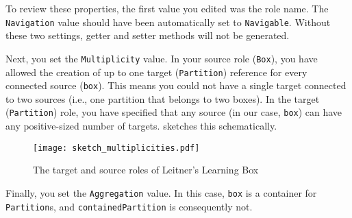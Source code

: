 To review these properties, the first value you edited was the role name. The \texttt{Navigation} value should have been automatically set to
\texttt{Na\-vi\-ga\-ble}. Without these two settings, getter and setter methods will not be generated.

Next, you set the \texttt{Multiplicity} value.  In your source role (\texttt{Box}), you have allowed the creation of up to one target (\texttt{Partition})
reference for every connected source (\texttt{box}). This means you could not have a single target connected to two sources (i.e., one partition that belongs to
two boxes). In the target (\texttt{Partition}) role, you have specified that any source (in our case, \texttt{box}) can have any positive-sized number of targets.
 sketches this schematically.

\vspace{0.5cm}

\begin{figure}[htbp]
	\centering
    \texttt{[image: sketch\_multiplicities.pdf]}
	\caption{The target and source roles of Leitner's Learning Box}
	\label{fig:sketch_roles}
\end{figure}
\FloatBarrier

Finally, you set the \texttt{Aggregation} value. In this case, \texttt{box} is a container for \texttt{Partition}s, and \texttt{containedPartition} is
consequently not.

